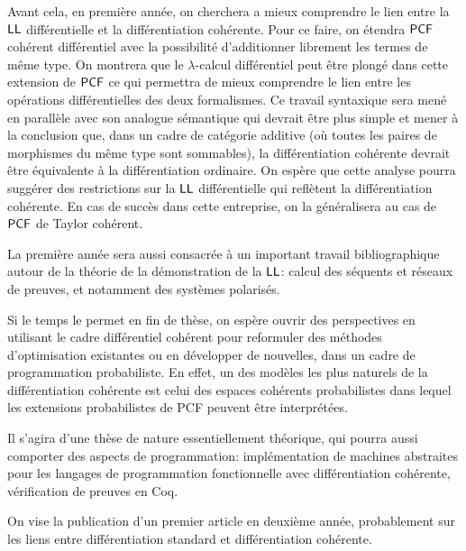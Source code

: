 \documentclass[a4]{article}
\begin{document}
Avant cela, en première année, on cherchera a mieux comprendre le lien
entre la $\hbox{\textsf{LL}}$ différentielle et la différentiation cohérente.
%
Pour ce faire, on étendra $\mathsf{PCF}$ cohérent différentiel avec la
possibilité d'additionner librement les termes de même type.
%
On montrera que le $\lambda$-calcul différentiel peut être plongé dans
cette extension de $\mathsf{PCF}$ ce qui permettra de mieux comprendre le lien
entre les opérations différentielles des deux formalismes.
%
Ce travail syntaxique sera mené en parallèle avec son analogue
sémantique qui devrait être plus simple et mener à la conclusion que,
dans un cadre de catégorie additive (où toutes les paires de
morphismes du même type sont sommables), la différentiation cohérente
devrait être équivalente à la différentiation ordinaire.
%
On espère que cette analyse pourra suggérer des restrictions sur la
$\hbox{\textsf{LL}}$ différentielle qui reflètent la différentiation cohérente.
%
En cas de succès dans cette entreprise, on la généralisera au cas de
$\mathsf{PCF}$ de Taylor cohérent.

La première année sera aussi consacrée à un important travail
bibliographique autour de la théorie de la démonstration de la $\hbox{\textsf{LL}}$:
calcul des séquents et réseaux de preuves, et notamment des systèmes
polarisés. 


Si le temps le permet en fin de thèse, on espère ouvrir des
perspectives en utilisant le cadre différentiel cohérent pour
reformuler des méthodes d'optimisation existantes ou en développer de
nouvelles, dans un cadre de programmation probabiliste.
%
En effet, un des modèles les plus naturels de la différentiation
cohérente est celui des espaces cohérents probabilistes dans lequel
les extensions probabilistes de PCF peuvent être interprétées.

Il s'agira d'une thèse de nature essentiellement théorique, qui pourra
aussi comporter des aspects de programmation: implémentation de
machines abstraites pour les langages de programmation fonctionnelle
avec différentiation cohérente, vérification de preuves en Coq.

On vise la publication d'un premier article en deuxième année,
probablement sur les liens entre différentiation standard et
différentiation cohérente.




\end{document}
